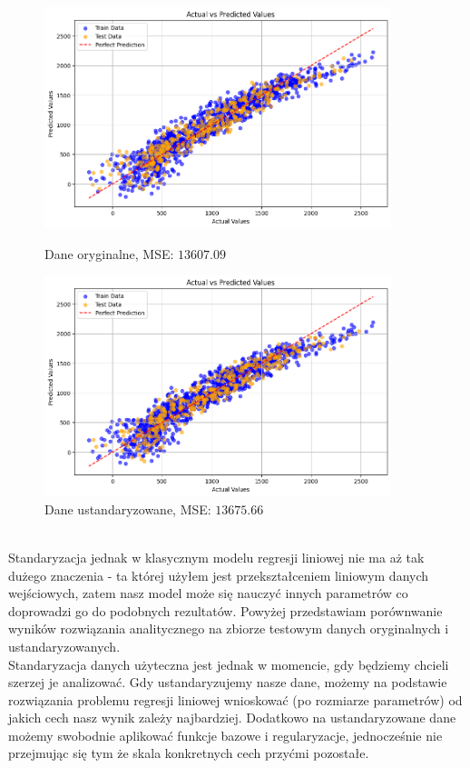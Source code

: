 \documentclass[polish,12pt,a4paper]{extarticle}
\begin{document}
\begin{figure}[h!]
    \centering
    \begin{minipage}[b]{0.48\textwidth}
        \centering
    \includegraphics[width=0.9\textwidth]{data/regular.png} %
    \caption{Dane oryginalne, MSE: $13607.09$}
    \end{minipage}
    \hspace{0.02\textwidth}
    \begin{minipage}[b]{0.48\textwidth}
        \centering
    \includegraphics[width=0.9\textwidth]{data/standard.png} %
    \caption{Dane ustandaryzowane, MSE: $13675.66$}
    \end{minipage}
\end{figure} \\
Standaryzacja jednak w klasycznym modelu regresji liniowej nie ma aż tak dużego znaczenia - ta której użyłem jest przekształceniem liniowym danych wejściowych, zatem nasz model może się nauczyć innych parametrów co doprowadzi go do podobnych rezultatów. Powyżej przedstawiam porównwanie wyników rozwiązania analitycznego na zbiorze testowym danych oryginalnych i ustandaryzowanych. \bigskip \\
Standaryzacja danych użyteczna jest jednak w momencie, gdy będziemy chcieli szerzej je analizować. Gdy ustandaryzujemy nasze dane, możemy na podstawie rozwiązania problemu regresji liniowej wnioskować (po rozmiarze parametrów) od jakich cech nasz wynik zależy najbardziej. Dodatkowo na ustandaryzowane dane możemy swobodnie aplikować funkcje bazowe i regularyzacje, jednocześnie nie przejmując się tym że skala konkretnych cech przyćmi pozostałe.
\end{document}
